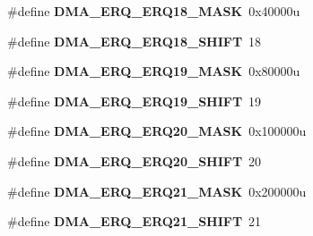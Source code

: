 \begin{DoxyCompactItemize}
\item 
\hypertarget{group___d_m_a___register___masks_ga72cae77c914b1a6f8d8059c5cb1455b3}{}\#define {\bfseries D\+M\+A\+\_\+\+E\+R\+Q\+\_\+\+E\+R\+Q18\+\_\+\+M\+A\+S\+K}~0x40000u\label{group___d_m_a___register___masks_ga72cae77c914b1a6f8d8059c5cb1455b3}

\item 
\hypertarget{group___d_m_a___register___masks_ga12e1a4505f675b73fab96d8180e446ad}{}\#define {\bfseries D\+M\+A\+\_\+\+E\+R\+Q\+\_\+\+E\+R\+Q18\+\_\+\+S\+H\+I\+F\+T}~18\label{group___d_m_a___register___masks_ga12e1a4505f675b73fab96d8180e446ad}

\item 
\hypertarget{group___d_m_a___register___masks_gab0cb51a675f3f02b94a946114d41aaa4}{}\#define {\bfseries D\+M\+A\+\_\+\+E\+R\+Q\+\_\+\+E\+R\+Q19\+\_\+\+M\+A\+S\+K}~0x80000u\label{group___d_m_a___register___masks_gab0cb51a675f3f02b94a946114d41aaa4}

\item 
\hypertarget{group___d_m_a___register___masks_ga694e20a04831149fb0b201303e7f9eee}{}\#define {\bfseries D\+M\+A\+\_\+\+E\+R\+Q\+\_\+\+E\+R\+Q19\+\_\+\+S\+H\+I\+F\+T}~19\label{group___d_m_a___register___masks_ga694e20a04831149fb0b201303e7f9eee}

\item 
\hypertarget{group___d_m_a___register___masks_ga2f31e183e2cdc28c486f154ebacc5e7e}{}\#define {\bfseries D\+M\+A\+\_\+\+E\+R\+Q\+\_\+\+E\+R\+Q20\+\_\+\+M\+A\+S\+K}~0x100000u\label{group___d_m_a___register___masks_ga2f31e183e2cdc28c486f154ebacc5e7e}

\item 
\hypertarget{group___d_m_a___register___masks_ga22975c5ea7aaec6af95d70f61af1507f}{}\#define {\bfseries D\+M\+A\+\_\+\+E\+R\+Q\+\_\+\+E\+R\+Q20\+\_\+\+S\+H\+I\+F\+T}~20\label{group___d_m_a___register___masks_ga22975c5ea7aaec6af95d70f61af1507f}

\item 
\hypertarget{group___d_m_a___register___masks_ga0ddd6ea28fc13c23a6ddfa8e5cec4dd3}{}\#define {\bfseries D\+M\+A\+\_\+\+E\+R\+Q\+\_\+\+E\+R\+Q21\+\_\+\+M\+A\+S\+K}~0x200000u\label{group___d_m_a___register___masks_ga0ddd6ea28fc13c23a6ddfa8e5cec4dd3}

\item 
\hypertarget{group___d_m_a___register___masks_gaac5371a1ef28e145e6d2979453312ed5}{}\#define {\bfseries D\+M\+A\+\_\+\+E\+R\+Q\+\_\+\+E\+R\+Q21\+\_\+\+S\+H\+I\+F\+T}~21\label{group___d_m_a___register___masks_gaac5371a1ef28e145e6d2979453312ed5}


\end{DoxyCompactItemize}
